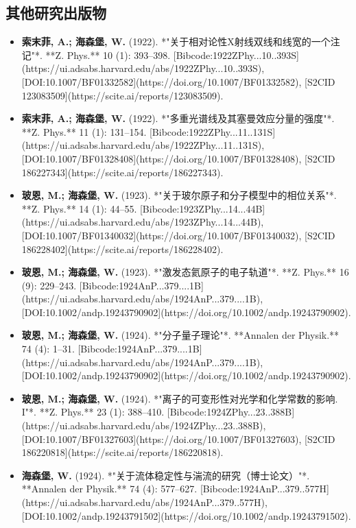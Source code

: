\subsection{其他研究出版物}  
\begin{itemize}
\item \textbf{索末菲, A.; 海森堡, W.} (1922). *"关于相对论性X射线双线和线宽的一个注记"*. **Z. Phys.** 10 (1): 393–398. [Bibcode:1922ZPhy...10..393S](https://ui.adsabs.harvard.edu/abs/1922ZPhy...10..393S), [DOI:10.1007/BF01332582](https://doi.org/10.1007/BF01332582), [S2CID 123083509](https://scite.ai/reports/123083509).  
\item \textbf{索末菲, A.; 海森堡, W.} (1922). *"多重光谱线及其塞曼效应分量的强度"*. **Z. Phys.** 11 (1): 131–154. [Bibcode:1922ZPhy...11..131S](https://ui.adsabs.harvard.edu/abs/1922ZPhy...11..131S), [DOI:10.1007/BF01328408](https://doi.org/10.1007/BF01328408), [S2CID 186227343](https://scite.ai/reports/186227343).  
\item \textbf{玻恩, M.; 海森堡, W.} (1923). *"关于玻尔原子和分子模型中的相位关系"*. **Z. Phys.** 14 (1): 44–55. [Bibcode:1923ZPhy...14...44B](https://ui.adsabs.harvard.edu/abs/1923ZPhy...14...44B), [DOI:10.1007/BF01340032](https://doi.org/10.1007/BF01340032), [S2CID 186228402](https://scite.ai/reports/186228402).  
\item \textbf{玻恩, M.; 海森堡, W.} (1923). *"激发态氦原子的电子轨道"*. **Z. Phys.** 16 (9): 229–243. [Bibcode:1924AnP...379....1B](https://ui.adsabs.harvard.edu/abs/1924AnP...379....1B), [DOI:10.1002/andp.19243790902](https://doi.org/10.1002/andp.19243790902).  
\item \textbf{玻恩, M.; 海森堡, W.} (1924). *"分子量子理论"*. **Annalen der Physik.** 74 (4): 1–31. [Bibcode:1924AnP...379....1B](https://ui.adsabs.harvard.edu/abs/1924AnP...379....1B), [DOI:10.1002/andp.19243790902](https://doi.org/10.1002/andp.19243790902).  
\item \textbf{玻恩, M.; 海森堡, W.} (1924). *"离子的可变形性对光学和化学常数的影响. I"*. **Z. Phys.** 23 (1): 388–410. [Bibcode:1924ZPhy...23..388B](https://ui.adsabs.harvard.edu/abs/1924ZPhy...23..388B), [DOI:10.1007/BF01327603](https://doi.org/10.1007/BF01327603), [S2CID 186220818](https://scite.ai/reports/186220818).  
\item \textbf{海森堡, W. }(1924). *"关于流体稳定性与湍流的研究（博士论文）"*. **Annalen der Physik.** 74 (4): 577–627. [Bibcode:1924AnP...379..577H](https://ui.adsabs.harvard.edu/abs/1924AnP...379..577H), [DOI:10.1002/andp.19243791502](https://doi.org/10.1002/andp.19243791502).  

\end{itemize}
